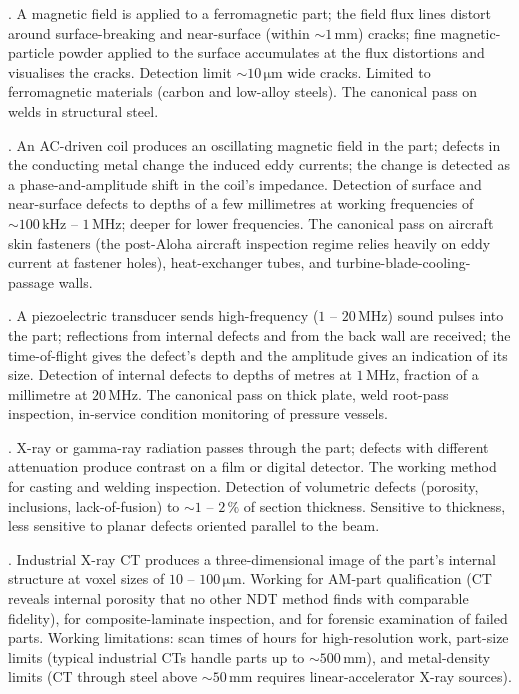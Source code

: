 . A magnetic field is applied
to a ferromagnetic part; the field flux lines distort around
surface-breaking and near-surface (within $\sim 1\,\text{mm}$) cracks;
fine magnetic-particle powder applied to the surface accumulates at
the flux distortions and visualises the cracks. Detection limit $\sim
10\,\si{\micro\meter}$ wide cracks. Limited to ferromagnetic materials
(carbon and low-alloy steels). The canonical pass on welds in
structural steel.

. An AC-driven coil produces an
oscillating magnetic field in the part; defects in the conducting
metal change the induced eddy currents; the change is detected as a
phase-and-amplitude shift in the coil's impedance. Detection of
surface and near-surface defects to depths of a few millimetres at
working frequencies of $\sim 100\,\text{kHz}$ -- $1\,\text{MHz}$;
deeper for lower frequencies. The canonical pass on aircraft skin
fasteners (the post-Aloha aircraft inspection regime relies heavily
on eddy current at fastener holes), heat-exchanger tubes, and
turbine-blade-cooling-passage walls.

. A piezoelectric transducer sends
high-frequency ($1$ -- $20\,\text{MHz}$) sound pulses into the part;
reflections from internal defects and from the back wall are
received; the time-of-flight gives the defect's depth and the
amplitude gives an indication of its size. Detection of internal
defects to depths of metres at $1\,\text{MHz}$, fraction of a
millimetre at $20\,\text{MHz}$. The canonical pass on thick plate,
weld root-pass inspection, in-service condition monitoring of
pressure vessels.

. X-ray or gamma-ray radiation
passes through the part; defects with different attenuation produce
contrast on a film or digital detector. The working method for
casting and welding inspection. Detection of volumetric defects
(porosity, inclusions, lack-of-fusion) to $\sim 1$ -- $2\,\%$ of
section thickness. Sensitive to thickness, less sensitive to planar
defects oriented parallel to the beam.

. Industrial
X-ray CT produces a three-dimensional image of the part's internal
structure at voxel sizes of $10$ -- $100\,\si{\micro\meter}$. Working
for AM-part qualification (CT reveals internal porosity that no other
NDT method finds with comparable fidelity), for composite-laminate
inspection, and for forensic examination of failed parts. Working
limitations: scan times of hours for high-resolution work, part-size
limits (typical industrial CTs handle parts up to $\sim 500\,\text{mm}$),
and metal-density limits (CT through steel above $\sim 50\,\text{mm}$
requires linear-accelerator X-ray sources).

